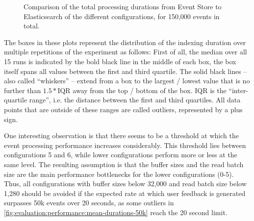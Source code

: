\begin{figure}[h]
        \caption{Comparison of the total processing durations from Event Store to Elasticsearch of the different configurations, for 150,000 events in total.}
        \label{fig:evaluation:performance:mean-durations-150k}
\end{figure}

The boxes in these plots represent the distribution of the indexing duration over multiple repetitions of the experiment as follows:
First of all, the median over all 15 runs is indicated by the bold black line in the middle of each box, the box itself spans all values between the first and third quartile.
The solid black lines -- also called ``whiskers'' -- extend from a box to the largest / lowest value that is no further than $ 1.5 * \text{IQR} $ away from the top / bottom of the box.
$\text{IQR}$ is the ``inter-quartile range'', i.e. the distance between the first and third quartiles.
All data points that are outside of these ranges are called outliers, represented by a plus sign.

One interesting observation is that there seems to be a threshold at which the event processing performance increases considerably.
This threshold lies between configurations 5 and 6, while lower configurations perform more or less at the same level.
The resulting assumption is that the buffer sizes and the read batch size are the main performance bottlenecks for the lower configurations (0-5).
Thus, all configurations with buffer sizes below 32,000 and read batch size below 1,280 should be avoided if the expected rate at which user feedback is generated surpasses 50k events over 20 seconds, as some outliers in \cref{fig:evaluation:performance:mean-durations-50k} reach the 20 second limit.

